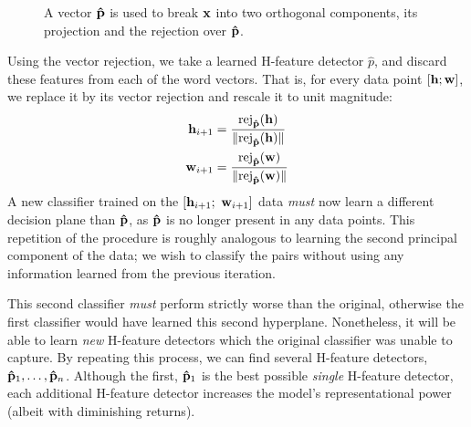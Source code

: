 \begin{figure}
\centering
{}
\caption{A vector ${\mathbf{\hat p}}$ is used to break ${\mathbf{x}}$ into two orthogonal components,
its projection and the rejection over ${\mathbf{\hat p}}$.}
\label{fig:vecproj}
\end{figure}

Using the vector rejection, we take a learned H-feature detector $\hat p$,
and discard these features from each of the word vectors. That is, for every data
point $[{\mathbf{h}}; {\mathbf{w}}]$, we replace it by its vector rejection and rescale
it to unit magnitude:
\begin{align*}
  {\mathbf{h}}_{i+1} & = \frac{\text{rej}_{{\mathbf{\hat p}}}({\mathbf{h}})}{\|\text{rej}_{{\mathbf{\hat p}}}({\mathbf{h}})\|}\\
  {\mathbf{w}}_{i+1} & = \frac{\text{rej}_{{\mathbf{\hat p}}}({\mathbf{w}})}{\|\text{rej}_{{\mathbf{\hat p}}}({\mathbf{w}})\|}
\end{align*}
A new classifier trained on the $[{\mathbf{h}}_{i+1};~{\mathbf{w}}_{i+1}]$ data {\em must} now
learn a different decision plane than ${\mathbf{\hat p}}$, as ${\mathbf{\hat p}}$ is no longer
present in any data points. This repetition of the procedure is roughly
analogous to learning the second principal component of the data; we wish to
classify the pairs without using any information learned from the previous
iteration.

This second classifier {\em must} perform strictly worse than the original,
otherwise the first classifier would have learned this second hyperplane.
Nonetheless, it will be able to learn {\em new} H-feature detectors
which the original classifier was unable to capture. By repeating this process,
we can find several H-feature detectors, ${\mathbf{\hat p}}_1, \ldots, {\mathbf{\hat p}}_n$. Although
the first, ${\mathbf{\hat p}}_1$ is the best possible {\em single} H-feature detector,
each additional H-feature detector increases the model's representational power
(albeit with diminishing returns).

